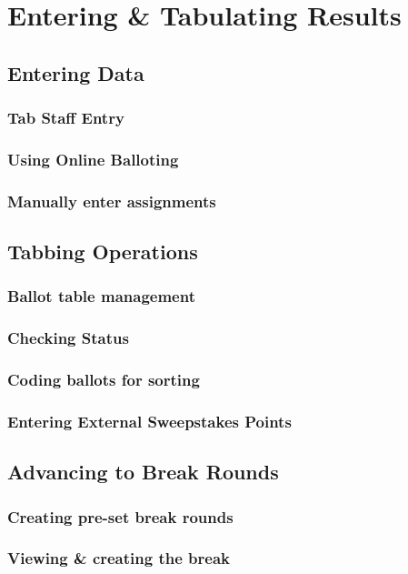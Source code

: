 \documentclass[12pt]{report}
\begin{document}
\chapter{Entering \& Tabulating Results}

	\section{Entering Data}
	\subsection{Tab Staff Entry}
	\subsection{Using Online Balloting}
	\subsection{Manually enter assignments}

	\section{Tabbing Operations}
	\subsection{Ballot table management}
	\subsection{Checking Status}
	\subsection{Coding ballots for sorting}
	\subsection{Entering External Sweepstakes Points}

	\section{Advancing to Break Rounds}

	\subsection{Creating pre-set break rounds}
	\subsection{Viewing \& creating the break}
\end{document}
